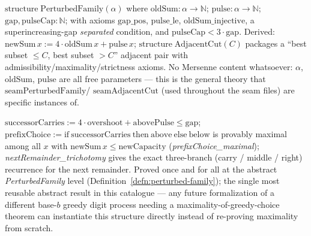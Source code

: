 \begin{defn}
\label{defn:perturbed-family}
$\mathrm{structure}\;\mathrm{PerturbedFamily}(\alpha)$ where
$\mathrm{oldSum}:\alpha\to\mathbb N$; $\mathrm{pulse}:\alpha\to\mathbb N$;
$\mathrm{gap},\mathrm{pulseCap}:\mathbb N$; with axioms $\mathrm{gap\_pos}$,
$\mathrm{pulse\_le}$, $\mathrm{oldSum\_injective}$, a superincreasing-gap
\emph{separated} condition, and $\mathrm{pulseCap} < 3\cdot\mathrm{gap}$. Derived:
$\mathrm{newSum}\,x := 4\cdot\mathrm{oldSum}\,x+\mathrm{pulse}\,x$;
$\mathrm{structure}\;\mathrm{AdjacentCut}(C)$ packages a ``best subset $\le C$, best
subset $>C$'' adjacent pair with admissibility/maximality/strictness axioms. No Mersenne
content whatsoever: $\alpha$, $\mathrm{oldSum}$, $\mathrm{pulse}$ are all free
parameters — this is the general theory that $\mathrm{seamPerturbedFamily}$/
$\mathrm{seamAdjacentCut}$ (used throughout the seam files) are specific instances of.
\par{}
\end{defn}

\begin{thm}
\label{thm:perturbed-family-maximality}
$\mathrm{successorCarries} := 4\cdot\mathrm{overshoot}+\mathrm{abovePulse} \le
\mathrm{gap}$; $\mathrm{prefixChoice} := \mathrm{if}\ \mathrm{successorCarries}\
\mathrm{then}\ \mathrm{above}\ \mathrm{else}\ \mathrm{below}$ is provably maximal among
all $x$ with $\mathrm{newSum}\,x\le\mathrm{newCapacity}$
(\emph{prefixChoice\_maximal}); \emph{nextRemainder\_trichotomy} gives the exact
three-branch (carry / middle / right) recurrence for the next remainder. Proved once and
for all at the abstract \emph{PerturbedFamily} level
(Definition~\ref{defn:perturbed-family}); the single most reusable abstract result in
this catalogue — any future formalization of a different base-$b$ greedy digit process
needing a maximality-of-greedy-choice theorem can instantiate this structure directly
instead of re-proving maximality from scratch.
\par{}
\end{thm}
